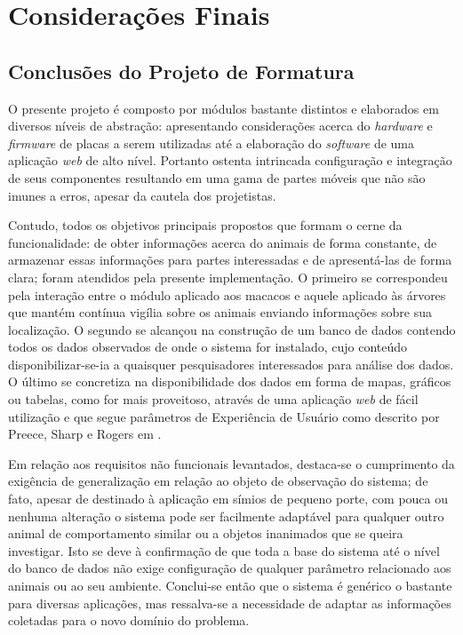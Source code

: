\chapter{Considerações Finais}

\section{Conclusões do Projeto de Formatura}
O presente projeto é composto por módulos bastante distintos e elaborados em diversos níveis de abstração: apresentando considerações acerca do \emph{hardware} e \emph{firmware} de placas a serem utilizadas até a elaboração do \emph{software} de uma aplicação \emph{web} de alto nível. Portanto ostenta intrincada configuração e integração de seus componentes resultando em uma gama de partes móveis que não são imunes a erros, apesar da cautela dos projetistas.

Contudo, todos os objetivos principais propostos que formam o cerne da funcionalidade: de obter informações acerca do animais de forma constante, de armazenar essas informações para partes interessadas e de apresentá-las de forma clara; foram atendidos pela presente implementação. O primeiro se correspondeu pela interação entre o módulo aplicado aos macacos e aquele aplicado às árvores que mantém contínua vigília sobre os animais enviando informações sobre sua localização. O segundo se alcançou na construção de um banco de dados contendo todos os dados observados de onde o sistema for instalado, cujo conteúdo disponibilizar-se-ia a quaisquer pesquisadores interessados para análise dos dados. O último se concretiza na disponibilidade dos dados em forma de mapas, gráficos ou tabelas, como for mais proveitoso, através de uma aplicação \emph{web} de fácil utilização e que segue parâmetros de Experiência de Usuário como descrito por Preece, Sharp e Rogers em \cite{preece}.

Em relação aos requisitos não funcionais levantados, destaca-se o cumprimento da exigência de generalização em relação ao objeto de observação do sistema; de fato, apesar de destinado à aplicação em símios de pequeno porte, com pouca ou nenhuma alteração o sistema pode ser facilmente adaptável para qualquer outro animal de comportamento similar ou a objetos inanimados que se queira investigar. Isto se deve à confirmação de que toda a base do sistema até o nível do banco de dados não exige configuração de qualquer parâmetro relacionado aos animais ou ao seu ambiente. Conclui-se então que o sistema é genérico o bastante para diversas aplicações, mas ressalva-se a necessidade de adaptar as informações coletadas para o novo domínio do problema.


